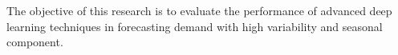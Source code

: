 The objective of this research is to evaluate the performance of advanced deep learning techniques in forecasting demand with high variability and seasonal component. 
